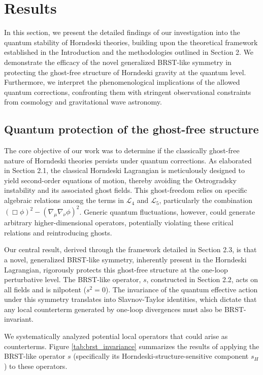 \documentclass[twocolumn]{aastex631}
\begin{document}
\section{Results}
\label{sec:results}
In this section, we present the detailed findings of our investigation into the quantum stability of Horndeski theories, building upon the theoretical framework established in the Introduction and the methodologies outlined in Section 2. We demonstrate the efficacy of the novel generalized BRST-like symmetry in protecting the ghost-free structure of Horndeski gravity at the quantum level. Furthermore, we interpret the phenomenological implications of the allowed quantum corrections, confronting them with stringent observational constraints from cosmology and gravitational wave astronomy.

\subsection{Quantum protection of the ghost-free structure}
The core objective of our work was to determine if the classically ghost-free nature of Horndeski theories persists under quantum corrections. As elaborated in Section 2.1, the classical Horndeski Lagrangian is meticulously designed to yield second-order equations of motion, thereby avoiding the Ostrogradsky instability and its associated ghost fields. This ghost-freedom relies on specific algebraic relations among the terms in $\mathcal{L}_4$ and $\mathcal{L}_5$, particularly the combination $(\Box\phi)^2 - (\nabla_\mu\nabla_\nu\phi)^2$. Generic quantum fluctuations, however, could generate arbitrary higher-dimensional operators, potentially violating these critical relations and reintroducing ghosts.

Our central result, derived through the framework detailed in Section 2.3, is that a novel, generalized BRST-like symmetry, inherently present in the Horndeski Lagrangian, rigorously protects this ghost-free structure at the one-loop perturbative level. The BRST-like operator, $s$, constructed in Section 2.2, acts on all fields and is nilpotent ($s^2=0$). The invariance of the quantum effective action under this symmetry translates into Slavnov-Taylor identities, which dictate that any local counterterm generated by one-loop divergences must also be BRST-invariant.

We systematically analyzed potential local operators that could arise as counterterms. Figure \ref{tab:brst_invariance} summarizes the results of applying the BRST-like operator $s$ (specifically its Horndeski-structure-sensitive component $s_H$) to these operators.
\end{document}
